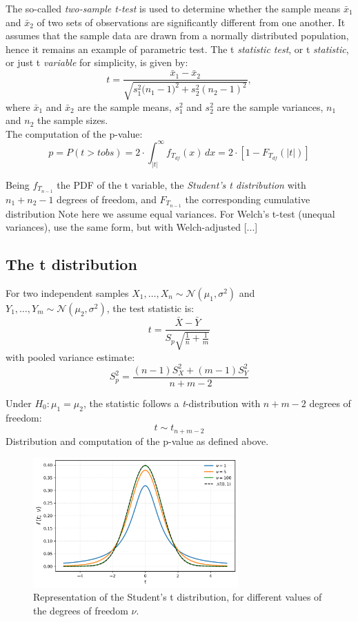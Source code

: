 \documentclass{book}
\begin{document}
The so-called \textit{two-sample t-test} is used to determine whether the sample means $\bar{x}_1$ and $\bar{x}_2$ of two sets of observations are significantly different from one another. It assumes that the sample data are drawn from a normally distributed population, hence it remains an example of parametric test. The t \textit{statistic test}, or t \textit{statistic}, or just t \textit{variable} for simplicity, is given by:
\begin{equation}
    t = \frac{\bar{x}_{1} - \bar{x}_{2}}{\sqrt{s^2_1 \big(n_{1} - 1)^{2} + s^2_2 (n_{2} - 1)^{2}}},
\end{equation}
where $\bar{x}_1$ and $\bar{x}_2$ are the sample means, $s^2_1$ and $s^2_2$ are the sample variances, $n_1$ and $n_2$ the sample sizes.\\

The computation of the p-value:
\begin{equation}
	p = P\left(t > t obs \right) = 2 \cdot \int_{|t|}^{\infty} f_{T_{df}}(x)\,dx = 2 \cdot \left[1 - F_{T_{df}}(|t|)\right]
\end{equation}

Being $f_{T_{n-1}}$ the PDF of the t variable, the \textit{Student's t distribution} with $n_1 + n_2 - 1$ degrees of freedom, and $F_{T_{n-1}}$ the corresponding cumulative distribution
Note here we assume equal variances. For Welch’s t-test (unequal variances), use the same form, but with Welch-adjusted [...]

\subsection*{The t distribution}

For two independent samples \( X_1, \ldots, X_n \sim \mathcal{N}(\mu_1, \sigma^2) \) and \( Y_1, \ldots, Y_m \sim \mathcal{N}(\mu_2, \sigma^2) \), the test statistic is:
\[
t = \frac{\bar{X} - \bar{Y}}{S_p \sqrt{\frac{1}{n} + \frac{1}{m}}}
\]
with pooled variance estimate:
\[
S_p^2 = \frac{(n-1)S_X^2 + (m-1)S_Y^2}{n + m - 2}
\]

Under \( H_0: \mu_1 = \mu_2 \), the statistic follows a \textit{t}-distribution with \( n + m - 2 \) degrees of freedom:
\[
t \sim t_{n+m-2}
\]
Distribution and computation of the p-value as defined above.

\begin{figure}[ht]
    \centering
    \includegraphics[width=0.7\textwidth]{figures/chapter4/t_distribution.png}
    \caption{Representation of the Student's t distribution, for different values of the degrees of freedom $\nu$.}
    \label{fig:t_distribution}
\end{figure}
\end{document}
